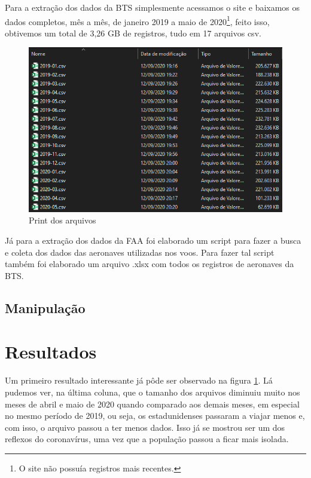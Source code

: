 \documentclass{article}
\begin{document}
Para a extração dos dados da BTS simplesmente acessamos o site e baixamos os dados completos, mês a mês, de janeiro 2019 a maio de 2020\footnote{O site não possuía registros mais recentes.}, feito isso, obtivemos um total de 3,26 GB de registros, tudo em 17 arquivos csv.
\begin{figure}[H]
    \centering
    \includegraphics[scale = 0.5]{Imagens/Arquivos.png}
    \caption{Print dos arquivos}
    \label{fig: print}
\end{figure}

Já para a extração dos dados da FAA foi elaborado um script para fazer a busca e coleta dos dados das aeronaves utilizadas nos voos. Para fazer tal script também foi elaborado um arquivo .xlsx com todos os registros de aeronaves da BTS.

\subsection{Manipulação}




\section{Resultados}

Um primeiro resultado interessante já pôde ser observado na figura \ref{fig: print}. Lá pudemos ver, na última coluna, que o tamanho dos arquivos diminuiu muito nos meses de abril e maio de 2020 quando comparado aos demais meses, em especial no mesmo período de 2019, ou seja, os estadunidenses passaram a viajar menos e, com isso, o arquivo passou a ter menos dados. Isso já se mostrou ser um dos reflexos do coronavírus, uma vez que a população passou a ficar mais isolada.



\printbibliography
\end{document}
